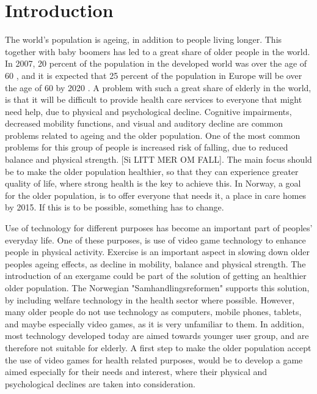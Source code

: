 \chapter{Introduction}

The world's population is ageing, in addition to people living longer. This together with baby boomers has led to a great share of older people in the world. In 2007, 20 percent of the population in the developed world was over the age of 60 \cite{dickinson2007methods}, and it is expected that 25 percent of the population in Europe will be over the age of 60 by 2020 \cite{ijsselsteijn2007digital}. A problem with such a great share of elderly in the world, is that it will be difficult to provide health care services to everyone that might need help, due to physical and psychological decline. Cognitive impairments, decreased mobility functions, and visual and auditory decline are common problems related to ageing and the older population. One of the most common problems for this group of people is increased risk of falling, due to reduced balance and physical strength. [Si LITT MER OM FALL]. The main focus should be to make the older population healthier, so that they can experience greater quality of life, where strong health is the key to achieve this. In Norway, a goal for the older population, is to offer everyone that needs it, a place in care homes by 2015. If this is to be possible, something has to change.     

Use of technology for different purposes has become an important part of peoples' everyday life. One of these purposes, is use of video game technology to enhance people in physical activity. Exercise is an important aspect in slowing down older peoples ageing effects, as decline in mobility, balance and physical strength. The introduction of an exergame could be part of the solution of getting an healthier older population. The Norwegian "Samhandlingsreformen" supports this solution, by including welfare technology in the health sector where possible. However, many older people do not use technology as computers, mobile phones, tablets, and maybe especially video games, as it is very unfamiliar to them. In addition, most technology developed today are aimed towards younger user group, and are therefore not suitable for elderly. A first step to make the older population accept the use of video games for health related purposes, would be to develop a game aimed especially for their needs and interest, where their physical and psychological declines are taken into consideration. 

